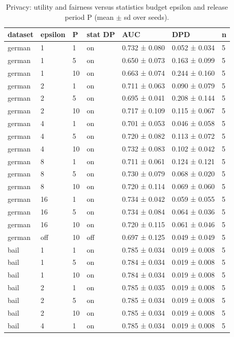 \begin{table}[t]
\centering
\small
\caption{Privacy: utility and fairness versus statistics budget epsilon and release period P (mean $\pm$ sd over seeds).}
\begin{tabular}{lllllll}
\toprule
dataset & epsilon & P & stat DP & AUC & DPD & n \\
\midrule
german & 1 & 1 & on & 0.732 ± 0.080 & 0.052 ± 0.034 & 5 \\
german & 1 & 5 & on & 0.650 ± 0.073 & 0.163 ± 0.099 & 5 \\
german & 1 & 10 & on & 0.663 ± 0.074 & 0.244 ± 0.160 & 5 \\
german & 2 & 1 & on & 0.711 ± 0.063 & 0.090 ± 0.079 & 5 \\
german & 2 & 5 & on & 0.695 ± 0.041 & 0.208 ± 0.144 & 5 \\
german & 2 & 10 & on & 0.717 ± 0.109 & 0.115 ± 0.067 & 5 \\
german & 4 & 1 & on & 0.701 ± 0.053 & 0.046 ± 0.058 & 5 \\
german & 4 & 5 & on & 0.720 ± 0.082 & 0.113 ± 0.072 & 5 \\
german & 4 & 10 & on & 0.732 ± 0.083 & 0.102 ± 0.042 & 5 \\
german & 8 & 1 & on & 0.711 ± 0.061 & 0.124 ± 0.121 & 5 \\
german & 8 & 5 & on & 0.730 ± 0.079 & 0.068 ± 0.020 & 5 \\
german & 8 & 10 & on & 0.720 ± 0.114 & 0.069 ± 0.060 & 5 \\
german & 16 & 1 & on & 0.734 ± 0.042 & 0.059 ± 0.055 & 5 \\
german & 16 & 5 & on & 0.734 ± 0.084 & 0.064 ± 0.036 & 5 \\
german & 16 & 10 & on & 0.720 ± 0.115 & 0.061 ± 0.046 & 5 \\
german & off & 10 & off & 0.697 ± 0.125 & 0.049 ± 0.049 & 5 \\
bail & 1 & 1 & on & 0.785 ± 0.034 & 0.019 ± 0.008 & 5 \\
bail & 1 & 5 & on & 0.784 ± 0.034 & 0.019 ± 0.008 & 5 \\
bail & 1 & 10 & on & 0.784 ± 0.034 & 0.019 ± 0.008 & 5 \\
bail & 2 & 1 & on & 0.785 ± 0.035 & 0.019 ± 0.008 & 5 \\
bail & 2 & 5 & on & 0.785 ± 0.034 & 0.019 ± 0.008 & 5 \\
bail & 2 & 10 & on & 0.785 ± 0.034 & 0.019 ± 0.008 & 5 \\
bail & 4 & 1 & on & 0.785 ± 0.034 & 0.019 ± 0.008 & 5 \\

\end{tabular}
\end{table}
